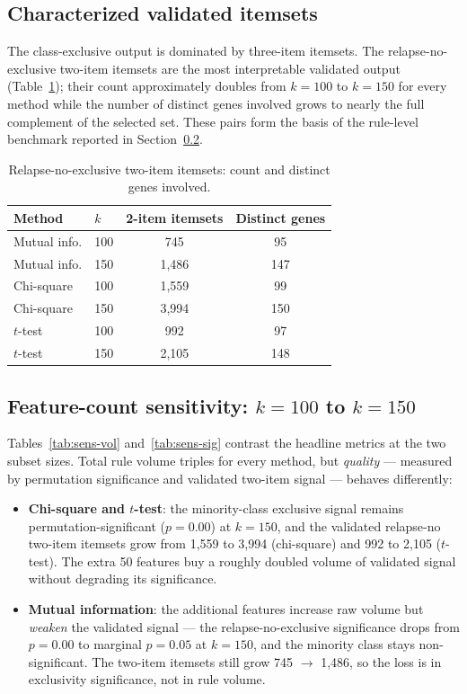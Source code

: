 \documentclass[twocolumn]{article}
\begin{document}
\subsection{Characterized validated itemsets}
\label{sec:res-char}

The class-exclusive output is dominated by three-item itemsets. The
relapse-no-exclusive two-item itemsets are the most interpretable validated
output (Table~\ref{tab:twoitem}); their count approximately doubles from
$k{=}100$ to $k{=}150$ for every method while the number of distinct genes
involved grows to nearly the full complement of the selected set. These pairs
form the basis of the rule-level benchmark reported in
Section~\ref{sec:res-sensitivity}.


\begin{table}[h]
\centering
\small
\caption{Relapse-no-exclusive two-item itemsets: count and distinct genes involved.}
\label{tab:twoitem}
\begin{tabular}{llcc}
\toprule
Method & $k$ & 2-item itemsets & Distinct genes \\
\midrule
Mutual info. & 100 & 745 & 95 \\
Mutual info. & 150 & 1{,}486 & 147 \\
Chi-square & 100 & 1{,}559 & 99 \\
Chi-square & 150 & 3{,}994 & 150 \\
$t$-test & 100 & 992 & 97 \\
$t$-test & 150 & 2{,}105 & 148 \\
\bottomrule
\end{tabular}
\end{table}

\subsection{Feature-count sensitivity: $k = 100$ to $k = 150$}
\label{sec:res-sensitivity}

Tables~\ref{tab:sens-vol} and~\ref{tab:sens-sig} contrast the headline
metrics at the two subset sizes.
Total rule volume triples for every method, but \emph{quality} --- measured by
permutation significance and validated two-item signal --- behaves
differently:

\begin{itemize}
    \item \textbf{Chi-square and $t$-test}: the minority-class exclusive signal
    remains permutation-significant ($p = 0.00$) at $k = 150$, and the
    validated relapse-no two-item itemsets grow from 1{,}559 to 3{,}994
    (chi-square) and 992 to 2{,}105 ($t$-test). The extra 50 features buy a
    roughly doubled volume of validated signal without degrading its
    significance.
    \item \textbf{Mutual information}: the additional features increase raw
    volume but \emph{weaken} the validated signal --- the relapse-no-exclusive
    significance drops from $p = 0.00$ to marginal $p = 0.05$ at $k = 150$,
    and the minority class stays non-significant. The two-item itemsets still
    grow 745 $\rightarrow$ 1{,}486, so the loss is in exclusivity significance,
    not in rule volume.
\end{itemize}
\end{document}
